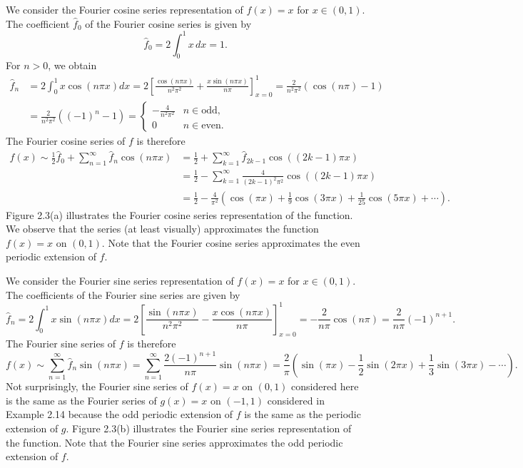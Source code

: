 \begin{example}[Fourier Cosine Series of $f(x) = x$ on $(0, 1)$][2.17]
    We consider the Fourier cosine series representation of $f(x) = x$ for $x \in (0, 1)$. The coefficient $\hat{f}_0$ of the Fourier cosine series is given by
    \[\hat{f}_0 = 2 \int_0^1 x\,dx = 1.\]
    For $n > 0$, we obtain
    \begin{align*}
        \hat{f}_n &= 2 \int_0^1 x \cos(n\pi x) dx = 2 \left[\frac{\cos(n\pi x)}{n^2\pi^2} + \frac{x \sin(n\pi x)}{n\pi}\right]_{x=0}^{1} = \frac{2}{n^2\pi^2} (\cos(n\pi) - 1) \\
        &= \frac{2}{n^2\pi^2} ((-1)^n - 1) = \begin{cases} -\frac{4}{n^2\pi^2} & n \in \text{odd}, \\ 0 & n \in \text{even}. \end{cases}
    \end{align*}
    The Fourier cosine series of $f$ is therefore
    \begin{align*}
        f(x) \sim \frac{1}{2} \hat{f}_0 + \sum_{n=1}^{\infty} \hat{f}_n \cos(n\pi x) &= \frac{1}{2} + \sum_{k=1}^{\infty} \hat{f}_{2k-1} \cos((2k-1)\pi x) \\
        &= \frac{1}{2} - \sum_{k=1}^{\infty} \frac{4}{(2k-1)^2\pi^2} \cos((2k-1)\pi x) \\
        &= \frac{1}{2} - \frac{4}{\pi^2} \left(\cos(\pi x) + \frac{1}{9} \cos(3\pi x) + \frac{1}{25} \cos(5\pi x) + \cdots\right).
    \end{align*}
    Figure 2.3(a) illustrates the Fourier cosine series representation of the function. We observe that the series (at least visually) approximates the function $f(x) = x$ on $(0, 1)$. Note that the Fourier cosine series approximates the even periodic extension of $f$.
\end{example}


\begin{example}[Fourier Sine Series Approximation of $f(x) = x$ on $(0, 1)$][2.18]
    We consider the Fourier sine series representation of $f(x) = x$ for $x \in (0, 1)$. The coefficients of the Fourier sine series are given by
    \[\hat{f}_n = 2 \int_0^1 x \sin(n\pi x) dx = 2 \left[\frac{\sin(n\pi x)}{n^2\pi^2} - \frac{x \cos(n\pi x)}{n\pi}\right]_{x=0}^{1} = -\frac{2}{n\pi} \cos(n\pi) = \frac{2}{n\pi} (-1)^{n+1}.\]
    The Fourier sine series of $f$ is therefore
    \[f(x) \sim \sum_{n=1}^{\infty} \hat{f}_n \sin(n\pi x) = \sum_{n=1}^{\infty} \frac{2(-1)^{n+1}}{n\pi} \sin(n\pi x) = \frac{2}{\pi} \left(\sin(\pi x) - \frac{1}{2} \sin(2\pi x) + \frac{1}{3} \sin(3\pi x) - \cdots\right).\]
    Not surprisingly, the Fourier sine series of $f(x) = x$ on $(0, 1)$ considered here is the same as the Fourier series of $g(x) = x$ on $(-1, 1)$ considered in Example 2.14 because the odd periodic extension of $f$ is the same as the periodic extension of $g$. Figure 2.3(b) illustrates the Fourier sine series representation of the function. Note that the Fourier sine series approximates the odd periodic extension of $f$.
\end{example}

